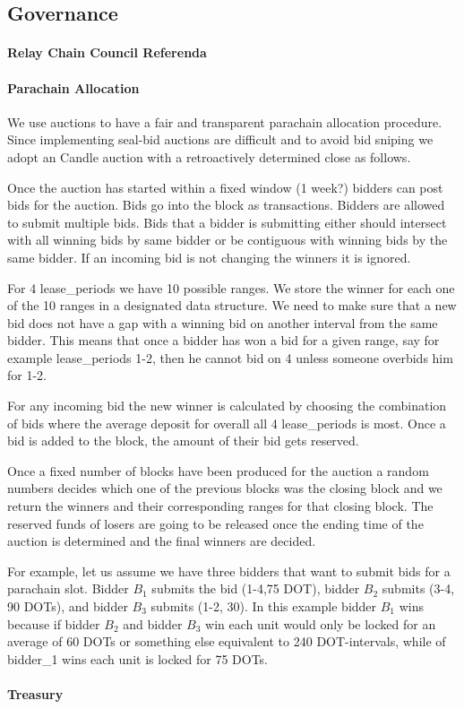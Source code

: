 \subsection{Governance}
 \paragraph{Relay Chain Council Referenda}
 \paragraph{Parachain Allocation}
We use auctions to have a fair and transparent parachain allocation procedure. Since implementing seal-bid auctions are difficult and to avoid bid sniping we adopt an Candle auction with a retroactively determined close as follows.

Once the auction has started within a fixed window (1 week?) bidders can post bids for the auction. Bids go into the block as transactions. Bidders are allowed to submit multiple bids. Bids that a bidder is submitting either should intersect with all winning bids by same bidder or be contiguous with winning bids by the same bidder. If an incoming bid is not changing the winners it is ignored.

For 4 lease_periods we have 10 possible ranges. We store the winner for each one of the 10 ranges in a designated data structure. We need to make sure that a new bid does not have a gap with a winning bid on another interval from the same bidder. This means that once a bidder has won a bid for a given range, say for example lease_periods 1-2, then he cannot bid on 4 unless someone overbids him for 1-2.

For any incoming bid the new winner is calculated by choosing the combination of bids where the average deposit for overall all 4 lease_periods is most. Once a bid is added to the block, the amount of their bid gets reserved.

Once a fixed number of blocks have been produced for the auction a random numbers decides which one of the previous blocks was the closing block and we return the winners and their corresponding ranges for that closing block. The reserved funds of losers are going to be released once the ending time of the auction is determined and the final winners are decided.

For example, let us assume we have three bidders that want to submit bids for a parachain slot. Bidder $B_1$ submits the bid (1-4,75 DOT), bidder $B_2$ submits (3-4, 90 DOTs), and bidder $B_3$ submits (1-2, 30). In this example bidder $B_1$ wins because if bidder $B_2$ and bidder $B_3$ win each unit would only be locked for an average of 60 DOTs or something else equivalent to 240 DOT-intervals, while of bidder_1 wins each unit is locked for 75 DOTs.

 \paragraph{Treasury}
